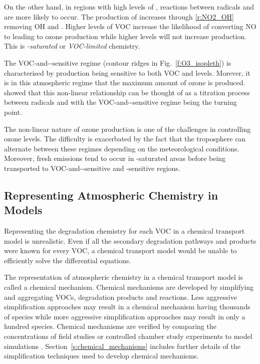 \newpage
On the other hand, in regions with high levels of , reactions between radicals and  are more likely to occur.
The production of  increases through \eqref{r:NO2_OH} removing OH and .
Higher levels of VOC increase the likelihood of  converting NO to  leading to ozone production while higher  levels will not increase  production.  
This is \emph{-saturated} or \emph{VOC-limited} chemistry.

The VOC-and--sensitive regime (contour ridges in Fig.~\ref{f:O3_isopleth}) is characterised by  production being sensitive to both VOC and  levels. 
Morever, it is in this atmospheric regime that the maximum amount of ozone is produced.
\citet{Kleinman:1994} showed that this non-linear relationship can be thought of as a titration process between radicals and  with the VOC-and--sensitive regime being the turning point.

The non-linear nature of ozone production is one of the challenges in controlling ozone levels.
The difficulty is exacerbated by the fact that the troposphere can alternate between these regimes depending on the meteorological conditions.
Moreover, fresh emissions tend to occur in -saturated areas before being transported to VOC-and--sensitive and -sensitive regions.

\subsection{Representing Atmospheric Chemistry in Models} \label{ss:chemistry_models}
Representing the degradation chemistry for each VOC in a chemical transport model is unrealistic.
Even if all the secondary degradation pathways and products were known for every VOC, a chemical transport model would be unable to efficiently solve the differential equations.

The representation of atmospheric chemistry in a chemical transport model is called a chemical mechanism.
Chemical mechanisms are developed by simplifying and aggregating VOCs, degradation products and reactions.
Less aggressive simplification approaches may result in a chemical mechanism having thousands of species while more aggressive simplification approaches may result in only a hundred species. 
Chemical mechanisms are verified by comparing the concentrations of field studies or controlled chamber study experiments to model simulations \citep{Stockwell:2012}.
Section~\ref{s:chemical_mechanisms} includes further details of the simplification techniques used to develop chemical mechanisms.

